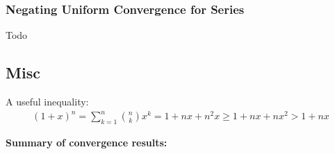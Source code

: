 \hypertarget{negating-uniform-convergence-for-series}{%
\subsubsection{Negating Uniform Convergence for
Series}\label{negating-uniform-convergence-for-series}}

Todo

\hypertarget{misc}{%
\subsection{Misc}\label{misc}}

A useful inequality:
\begin{align*}
(1+x)^n = \sum_{k=1}^n {n \choose k}x^k = 1 + nx + n^2 x \geq 1 + nx + nx^2 > 1 + nx
\end{align*}

\textbf{Summary of convergence results:}

